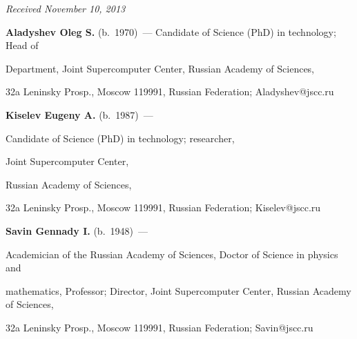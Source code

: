 







\vspace*{-6pt}





\hfill{\small\textit{Received November 10, 2013}}





      \Contr





\noindent


\textbf{Aladyshev Oleg S.} (b.\ 1970)~--- Candidate of Science (PhD) in technology; Head of


Department, Joint Supercomputer Center, Russian Academy of Sciences,


      32a Leninsky Prosp., Moscow 119991, Russian Federation; Aladyshev@jscc.ru





      \vspace*{3pt}





      \noindent


      \textbf{Kiselev Eugeny A.} (b.\ 1987)~---


      Candidate of Science (PhD) in technology; researcher,


      Joint Supercomputer Center,


Russian Academy of Sciences,


      32a Leninsky Prosp., Moscow 119991, Russian Federation; Kiselev@jscc.ru





      \vspace*{3pt}





      \noindent


      \textbf{Savin Gennady I.} (b.\ 1948)~---


      Academician of the Russian Academy of Sciences, Doctor of Science in physics and


mathematics, Professor; Director, Joint Supercomputer Center, Russian Academy of Sciences,


      32a Leninsky Prosp., Moscow 119991, Russian Federation; Savin@jscc.ru





